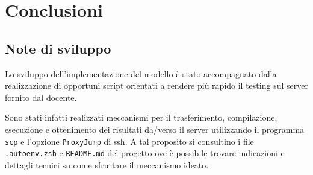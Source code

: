 \section{Conclusioni}

\subsection{Note di sviluppo}
Lo sviluppo dell'implementazione del modello è stato accompagnato dalla
realizzazione di opportuni script orientati a rendere più rapido il testing sul
server fornito dal docente.

Sono stati infatti realizzati meccanismi per il trasferimento, compilazione,
esecuzione e ottenimento dei risultati da/verso il server utilizzando il
programma \texttt{scp} e l'opzione \texttt{ProxyJump} di ssh.
A tal proposito si consultino i file \texttt{.autoenv.zsh} e \texttt{README.md}
del progetto ove è possibile trovare indicazioni e dettagli tecnici su come
sfruttare il meccanismo ideato.
